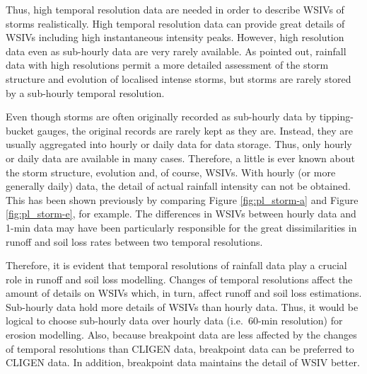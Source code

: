 
Thus, high temporal resolution data are needed in order to describe WSIVs of
storms realistically. High temporal resolution data can provide great details of
WSIVs including high instantaneous intensity peaks. However, high resolution
data even as sub-hourly data are very rarely available.
As \citet{allott2002-73} pointed out, rainfall data with high resolutions permit
a more detailed assessment of the storm structure and evolution of localised
intense storms, but storms are rarely stored by a sub-hourly temporal
resolution.

Even though storms are often originally recorded as sub-hourly data by
tipping-bucket gauges, the original records are rarely kept as they are.
Instead, they are usually aggregated into hourly or daily data for data storage.
Thus, only hourly or daily data are available in many cases.
Therefore, a little is ever known about the storm structure, evolution and, of
course, WSIVs. With hourly (or more generally daily) data, the detail of
actual rainfall intensity can not be obtained. This has been shown
previously by comparing Figure \ref{fig:pl_storm-a} and Figure
\ref{fig:pl_storm-e}, for example. The differences in WSIVs between hourly data
and 1-min data may have been particularly responsible for the great
dissimilarities in runoff and soil loss rates between two temporal resolutions.

Therefore, it is evident that temporal resolutions of rainfall data play a
crucial role in runoff and soil loss modelling. Changes of temporal resolutions
affect the amount of details on WSIVs which, in turn, affect runoff and soil
loss estimations.
Sub-hourly data hold more details of WSIVs than hourly data. Thus, it would be
logical to choose sub-hourly data over hourly data (i.e.\ 60-min resolution) for
erosion modelling. Also, because breakpoint data are less affected by the
changes of temporal resolutions than CLIGEN data, breakpoint data can be
preferred to CLIGEN data. In addition, breakpoint data maintains the detail of
WSIV better.

